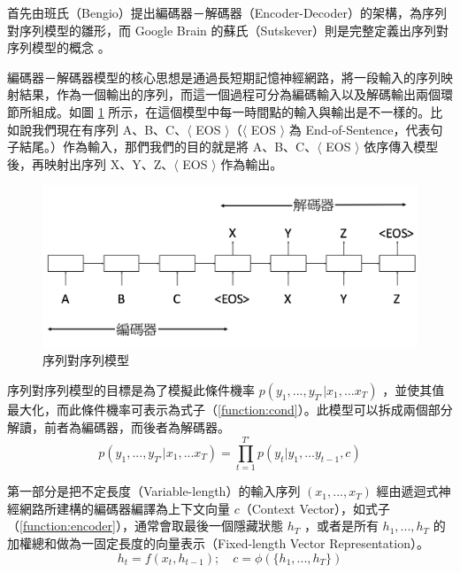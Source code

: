 首先由班氏（Bengio）提出編碼器－解碼器（Encoder-Decoder）的架構\cite{cho2014learning}，為序列對序列模型的雛形，而 Google Brain 的蘇氏（Sutskever）則是完整定義出序列對序列模型的概念 \cite{sutskever2014sequence} 。

編碼器－解碼器模型的核心思想是通過長短期記憶神經網路，將一段輸入的序列映射結果，作為一個輸出的序列，而這一個過程可分為編碼輸入以及解碼輸出兩個環節所組成。如圖 \ref{fig:seq2seq} 所示，在這個模型中每一時間點的輸入與輸出是不一樣的。比如說我們現在有序列 A、B、C、$\langle$ EOS $\rangle$（$\langle$ EOS $\rangle$ 為 End-of-Sentence，代表句子結尾。）作為輸入，那們我們的目的就是將 A、B、C、$\langle$ EOS $\rangle$ 依序傳入模型後，再映射出序列 X、Y、Z、$\langle$ EOS $\rangle$ 作為輸出。

\begin{figure}[h]
    \centering
    \includegraphics[scale=0.5]{images/chap2_seq2seq.png}
    \caption{序列對序列模型}\label{fig:seq2seq}
\end{figure}

序列對序列模型的目標是為了模擬此條件機率 $p(y_1,...,y_{T'}|x_1,...x_T)$ ，並使其值最大化，而此條件機率可表示為式子（\ref{function:cond}）。此模型可以拆成兩個部分解讀，前者為編碼器，而後者為解碼器。
\begin{equation}
    p(y_1,...,y_{T'}|x_1,...x_T) = \prod_{t=1}^{T'}p(y_t|y_1,...y_{t-1},c) \label{function:cond}
\end{equation}

第一部分是把不定長度（Variable-length）的輸入序列 $(x_1,...,x_T)$ 經由遞迴式神經網路所建構的編碼器編譯為上下文向量 $c$（Context Vector），如式子（\ref{function:encoder}），通常會取最後一個隱藏狀態 $h_T$ ，或者是所有 $h_1,...,h_T$ 的加權總和做為一固定長度的向量表示（Fixed-length Vector Representation）。
\begin{equation}
    h_t = f(x_t, h_{t-1});\quad  c = \phi(\{h_1,...,h_T\}) \label{function:encoder}
\end{equation}

